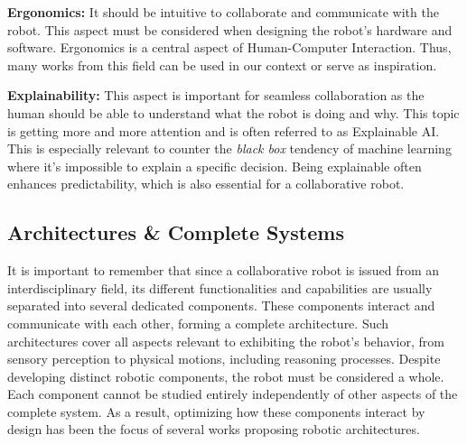 \textbf{Ergonomics:} It should be intuitive to collaborate and communicate with the robot. This aspect must be considered when designing the robot's hardware and software. Ergonomics is a central aspect of Human-Computer Interaction. Thus, many works from this field can be used in our context or serve as inspiration.

\textbf{Explainability:} This aspect is important for seamless collaboration as the human should be able to understand what the robot is doing and why. This topic is getting more and more attention and is often referred to as Explainable AI. This is especially relevant to counter the \textit{black box} tendency of machine learning where it's impossible to explain a specific decision. Being explainable often enhances predictability, which is also essential for a collaborative robot.

\subsection{Architectures \& Complete Systems}

It is important to remember that since a collaborative robot is issued from an interdisciplinary field, its different functionalities and capabilities are usually separated into several dedicated components. These components interact and communicate with each other, forming a complete architecture. Such architectures cover all aspects relevant to exhibiting the robot's behavior, from sensory perception to physical motions, including reasoning processes. 
Despite developing distinct robotic components, the robot must be considered a whole. Each component cannot be studied entirely independently of other aspects of the complete system. As a result, optimizing how these components interact by design has been the focus of several works proposing robotic architectures.

